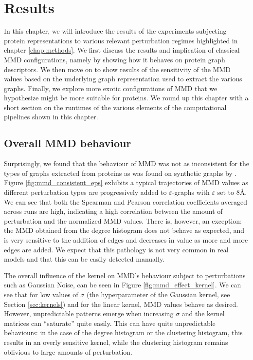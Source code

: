 \chapter{Results}\label{chap:results}

In this chapter, we will introduce the results of the experiments subjecting
protein representations to various relevant perturbation regimes highlighted in
chapter \ref{chap:methods}. We first discuss the results and implication of
classical MMD configurations, namely by showing how it behaves on protein
graph descriptors. We then move on to show results of the sensitivity of the MMD
values based on the underlying graph representation used to extract the various
graphs. Finally, we explore more exotic configurations of MMD that we
hypothesize might be more suitable for proteins. We round up this chapter with a
short section on the runtimes of the various elements of the computational
pipelines shown in this chapter.

\section{Overall MMD behaviour}

Surprisingly, we found that the behaviour of MMD was not as inconsistent for the
types of graphs extracted from proteins as was found on synthetic graphs by
\cite{o2021evaluation}. Figure \ref{fig:mmd_consistent_eps} exhibits a typical
trajectories of MMD values as different perturbation types are progressively
added to $\varepsilon$-graphs with $\varepsilon$ set to $8$\si{\angstrom}. We
can see that both the Spearman and Pearson correlation coefficients averaged
across runs are high, indicating a high correlation between the amount of
perturbation and the normalized MMD values. There is, however, an exception: the
MMD obtained from the degree histogram does not behave as expected, and is very
sensitive to the addition of edges and decreases in value as more and more edges
are added. We expect that this pathology is not very common in real models and
that this can be easily detected manually.

The overall influence of the kernel on MMD's behaviour subject to perturbations
such as Gaussian Noise, can be seen in Figure \ref{fig:mmd_effect_kernel}. We
can see that for low values of $\sigma$ (the hyperparameter of the Gaussian
kernel, see Section \ref{sec:kernels}) and for the linear kernel, MMD values
behave as desired. However, unpredictable patterns emerge when increasing
$\sigma$ and the kernel matrices can ``saturate'' quite easily. This can have
quite unpredictable behaviours: in the case of the degree histogram or the
clustering histogram, this results in an overly sensitive kernel, while the
clustering histogram remains oblivious to large amounts of perturbation.

